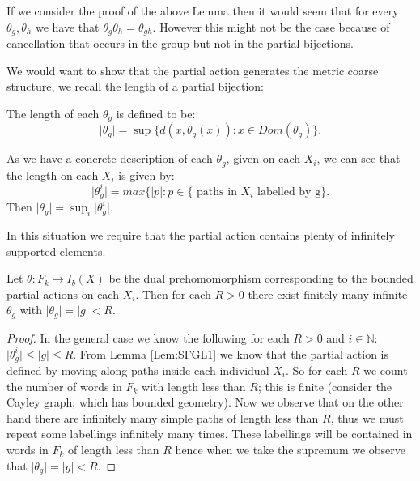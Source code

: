 \begin{conjecture}
\begin{remark}
If we consider the proof of the above Lemma then it would seem that for every $\theta_{g},\theta_{h}$ we have that $\theta_{g}\theta_{h} = \theta_{gh}$. However this might not be the case because of cancellation that occurs in the group but not in the partial bijections. 
\end{remark}

We would want to show that the partial action generates the metric coarse structure, we recall the length of a partial bijection:

\begin{definition}
The length of each $\theta_{g}$ is defined to be:
\begin{equation*}
\vert \theta_{g} \vert = \sup \lbrace d(x,\theta_{g}(x)) : x \in Dom(\theta_{g})\rbrace.
\end{equation*} 
\end{definition}

\begin{remark}
As we have a concrete description of each $\theta_{g}$, given on each $X_{i}$, we can see that the length on each $X_{i}$ is given by:
\begin{equation*}
\vert \theta_{g}^{i} \vert = max\lbrace \vert p \vert: p \in \lbrace \mbox{ paths in }X_{i}\mbox{ labelled by g}\rbrace.
\end{equation*} Then $\vert \theta_{g} \vert = \sup_{i} \vert \theta_{g}^{i} \vert$.
\end{remark}

In this situation we require that the partial action contains plenty of infinitely supported elements. 

\begin{proposition}\label{Prop:Inf}
Let $\theta: F_{k} \rightarrow I_{b}(X)$ be the dual prehomomorphism corresponding to the bounded partial actions on each $X_{i}$. Then for each $R>0$ there exist finitely many infinite $\theta_{g}$ with $\vert \theta_{g} \vert = \vert g \vert < R$. 
\end{proposition}
\begin{proof}

In the general case we know the following for each $R>0$ and $i \in \mathbb{N}$: $\vert \theta_{g}^{i} \vert \leq \vert g \vert \leq R$. From Lemma \ref{Lem:SFGL1} we know 
that the partial action is defined by moving along paths inside each individual $X_{i}$. So for each $R$ we count the number of words in $F_{k}$ with length less than $R$; this is finite (consider the Cayley graph, which has bounded geometry). Now we observe that on the other hand there are infinitely many simple paths of length less than $R$, thus we must repeat some labellings infinitely many times. These labellings will be contained in words in $F_{k}$ of length less than $R$ hence when we take the supremum we observe that $\vert \theta_{g} \vert = \vert g \vert < R$. \end{proof}


\end{conjecture}
